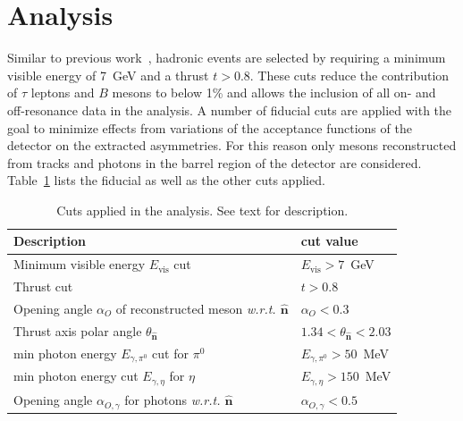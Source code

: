 \documentclass[aps,prX,preprint,groupedaddress,linenumbers]{revtex4-1}
\begin{document}
\section{Analysis}
\label{sec:analysis}

Similar to previous work~\cite{Abe:2005zx,Seidl:2008xc, Vossen:2011fk}, hadronic events are selected by requiring a minimum visible energy of 7~GeV and a thrust $t > 0.8$. 
These cuts reduce the contribution of $\tau$ leptons and $B$ mesons to below 1\% and allows the inclusion of all on- and off-resonance data in the analysis.
A number of fiducial cuts are applied with the goal to minimize effects from variations of the acceptance functions of the detector on the extracted asymmetries.
For this reason only mesons reconstructed from tracks and photons in the barrel region of the detector are considered. Table~\ref{tab:cuts} lists the fiducial as well as the other cuts applied.
\begin{table}
\begin{tabular}{ll}
Description & cut value\\
\hline
Minimum visible energy $E_\textrm{vis}$ cut &$E_\textrm{vis}>7$~GeV\\
Thrust cut & $t>0.8$\\
Opening angle $\alpha_O$ of reconstructed meson \em{w.r.t.} $\boldsymbol{\hat{n}}$\qquad \phantom{f} & $\alpha_O< 0.3$\\
Thrust axis polar angle $\theta_{\boldsymbol{\hat{n}}}$&$1.34< \theta_{\boldsymbol{\hat{n}}}<2.03$\\
min photon energy $E_{\gamma,\pi^0}$ cut for $\pi^0$ &$E_{\gamma,\pi^0}>50$~MeV \\
min photon energy cut $E_{\gamma,\eta}$  for $\eta$ &$E_{\gamma,\eta}>150$~MeV \\
Opening angle $\alpha_{O,\gamma}$ for photons \em{w.r.t.} $\boldsymbol{\hat{n}}$&$\alpha_{O,\gamma}<0.5$\\



\end{tabular}
\caption{Cuts applied in the analysis. See text for description.\label{tab:cuts}}
\end{table}
\end{document}
